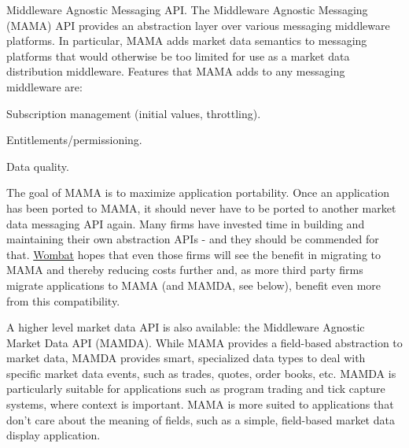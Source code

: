 Middleware Agnostic Messaging API. The Middleware Agnostic Messaging (MAMA) API provides an abstraction layer over various messaging middleware platforms. In particular, MAMA adds market data semantics to messaging platforms that would otherwise be too limited for use as a market data distribution middleware. Features that MAMA adds to any messaging middleware are:
\begin{DoxyItemize}
\item Subscription management (initial values, throttling).
\item Entitlements/permissioning.
\item Data quality.
\end{DoxyItemize}

The goal of MAMA is to maximize application portability. Once an application has been ported to MAMA, it should never have to be ported to another market data messaging API again. Many firms have invested time in building and maintaining their own abstraction APIs -\/ and they should be commended for that. \hyperlink{namespaceWombat}{Wombat} hopes that even those firms will see the benefit in migrating to MAMA and thereby reducing costs further and, as more third party firms migrate applications to MAMA (and MAMDA, see below), benefit even more from this compatibility.

A higher level market data API is also available: the Middleware Agnostic Market Data API (MAMDA). While MAMA provides a field-\/based abstraction to market data, MAMDA provides smart, specialized data types to deal with specific market data events, such as trades, quotes, order books, etc. MAMDA is particularly suitable for applications such as program trading and tick capture systems, where context is important. MAMA is more suited to applications that don't care about the meaning of fields, such as a simple, field-\/based market data display application. 